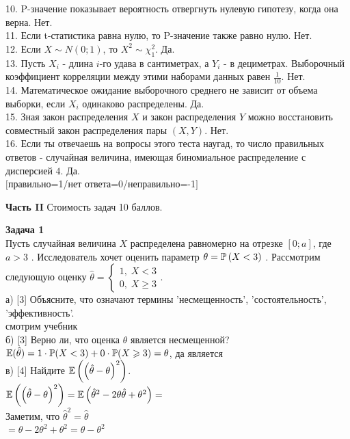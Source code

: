 \documentclass[12pt, a4paper]{article}\usepackage[]{graphicx}\usepackage[]{color}
\begin{document}
10. P-значение показывает вероятность отвергнуть нулевую гипотезу,
когда она верна. Нет. \\

11. Если t-статистика равна нулю, то P-значение также равно нулю.
 Нет.
\\

12. Если $X\sim N(0;1)$, то $X^{2}\sim \chi_{1}^{2}$. Да.  \\

13. Пусть $X_{i}$ - длина $i$-го удава в сантиметрах, а $Y_{i}$ -
в дециметрах. Выборочный коэффициент корреляции между этими
наборами данных равен $\frac{1}{10}$. Нет. \\

14. Математическое ожидание выборочного среднего не зависит от
объема выборки, если $X_{i}$ одинаково распределены. Да. \\

15. Зная закон распределения $X$ и закон распределения $Y$
можно восстановить совместный закон распределения пары $(X,Y)$. Нет. \\

16. Если ты отвечаешь на вопросы этого теста наугад, то число
правильных ответов - случайная величина, имеющая биномиальное
распределение с дисперсией $4$. Да. \\
$[$правильно=1/нет ответа=0/неправильно=-1$]$


{\bf Часть II} Стоимость задач 10 баллов.

{\bf Задача 1} \\
Пусть случайная величина  $X$  распределена
равномерно на отрезке $\left[0;a\right]$, где  $a>3$ .
Исследователь хочет оценить параметр  $\theta =\P\left(X<3\right)$
. Рассмотрим следующую оценку $\hat{\theta
}=\left\{\begin{array}{l} {1,\; X<3} \\ {0,\; X\ge 3}
\end{array}\right. $. \\
а) [3] Объясните, что означают термины 'несмещенность',
'состоятельность', 'эффективность'. \\
смотрим учебник \\
б) [3] Верно ли, что оценка $\hat{\theta}$ является несмещенной? \\
$\E(\hat{\theta})=1\cdot \P(X<3)+0\cdot \P(X \ge 3)=\theta$, да
является \\
 в) [4] Найдите $\E\left(\left(\hat{\theta }-\theta \right)^{2}
\right)$. \\
$\E\left(\left(\hat{\theta }-\theta \right)^{2} \right)=
\E\left(\hat{\theta}^{2}-2\theta\hat{\theta}+\theta^{2}\right)=$ \\
Заметим, что $\hat{\theta}^{2}=\hat{\theta}$ \\
$=\theta-2\theta^{2}+\theta^{2}=\theta-\theta^{2}$ \\
\end{document}
